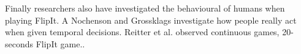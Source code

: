 Finally researchers also have investigated the behavioural of humans when playing FlipIt. A Nochenson and Grossklags \cite{nochenson2013behavioral}  investigate how people really act when given temporal decisions. Reitter et al. \cite{reitter2013risk} observed continuous games, 20-seconds FlipIt game..




